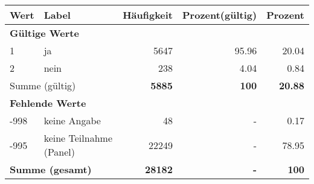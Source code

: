      \begin{longtable}{lXrrr}
     \toprule
     \textbf{Wert} & \textbf{Label} & \textbf{Häufigkeit} & \textbf{Prozent(gültig)} & \textbf{Prozent} \\
     \endhead
     \midrule
     \multicolumn{5}{l}{\textbf{Gültige Werte}}\\

     1 &
     \multicolumn{1}{X}{ ja   } &


       \num{5647} &
       \num[round-mode=places,round-precision=2]{95.96} &
         \num[round-mode=places,round-precision=2]{20.04} \\

     2 &
     \multicolumn{1}{X}{ nein   } &


       \num{238} &
       \num[round-mode=places,round-precision=2]{4.04} &
         \num[round-mode=places,round-precision=2]{0.84} \\
     \midrule
     \multicolumn{2}{l}{Summe (gültig)} &
       \textbf{\num{5885}} &
     \textbf{\num{100}} &
       \textbf{\num[round-mode=places,round-precision=2]{20.88}} \\
     \multicolumn{5}{l}{\textbf{Fehlende Werte}}\\
       -998 &
       keine Angabe &
         \num{48} &
        - &
         \num[round-mode=places,round-precision=2]{0.17} \\
       -995 &
       keine Teilnahme (Panel) &
         \num{22249} &
        - &
         \num[round-mode=places,round-precision=2]{78.95} \\
     \midrule
     \multicolumn{2}{l}{\textbf{Summe (gesamt)}} &
          \textbf{\num{28182}} &
        \textbf{-} &
        \textbf{\num{100}} \\
     \bottomrule
     \end{longtable}
     
